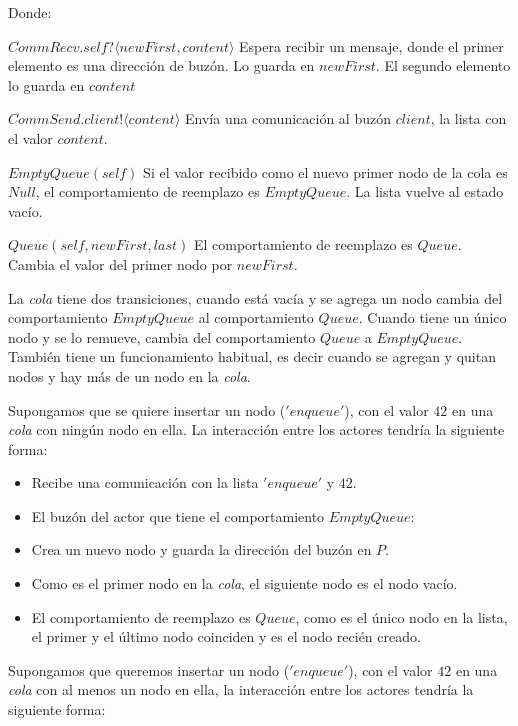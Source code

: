 Donde:

\begin{description}
 \item $CommRecv.self?\langle newFirst, content \rangle$ Espera recibir un mensaje, donde el primer elemento es una dirección de buzón. Lo guarda en $newFirst$. El segundo elemento lo guarda en $content$
 \item $CommSend.client!\langle content \rangle$ Envía una comunicación al buzón $client$, la lista con el valor $content$. 
 \item $EmptyQueue(self)$ Si el valor recibido como el nuevo primer nodo de la cola es $Null$, el comportamiento de reemplazo es $EmptyQueue$. La lista vuelve al estado vacío.
 \item $Queue(self, newFirst, last)$ El comportamiento de reemplazo es $Queue$. Cambia el valor del primer nodo por $newFirst$.
 \end{description}
 
La \textit{cola} tiene dos transiciones, cuando está vacía y se agrega un nodo cambia del comportamiento $EmptyQueue$ al comportamiento $Queue$. Cuando tiene un único nodo y se lo remueve, cambia del comportamiento $Queue$ a $EmptyQueue$. También tiene un funcionamiento habitual, es decir cuando se agregan y quitan nodos y hay más de un nodo en la \textit{cola}.

Supongamos que se quiere insertar un nodo ($'enqueue'$), con el valor $42$ en una \textit{cola} con ningún nodo en ella. La interacción entre los actores tendría la siguiente forma:

\begin{itemize}
 \item Recibe una comunicación con la lista $'enqueue'$ y $42$.
 \item El buzón del actor que tiene el comportamiento $EmptyQueue$:
 \item Crea un nuevo nodo y guarda la dirección del buzón en $P$.
 \item Como es el primer nodo en la \textit{cola}, el siguiente nodo es el nodo vacío.
 \item El comportamiento de reemplazo es $Queue$, como es el único nodo en la lista, el primer y el último nodo coinciden y es el nodo recién creado.
\end{itemize}

Supongamos que queremos insertar un nodo ($'enqueue'$), con el valor $42$ en una \textit{cola} con al menos un nodo en ella, la interacción entre los actores tendría la siguiente forma:

